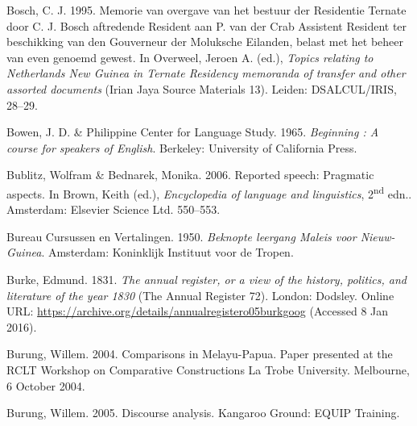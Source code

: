 \begin{styleCitaviBibliographyEntry}
Bosch, C. J. 1995. Memorie van overgave van het bestuur der Residentie Ternate door C. J. Bosch aftredende Resident aan P. van der Crab Assistent Resident ter beschikking van den Gouverneur der Moluksche Eilanden, belast met het beheer van even genoemd gewest. In Overweel, Jeroen A. (ed.), \textit{Topics relating to Netherlands New Guinea in Ternate Residency memoranda of transfer and other assorted documents} (Irian Jaya Source Materials 13). Leiden: DSALCUL/IRIS, 28–29.
\end{styleCitaviBibliographyEntry}

\begin{styleCitaviBibliographyEntry}
Bowen, J. D. \& Philippine Center for Language Study. 1965. \textit{Beginning : A course for speakers of English}. Berkeley: University of California Press.
\end{styleCitaviBibliographyEntry}

\begin{styleCitaviBibliographyEntry}
Bublitz, Wolfram \& Bednarek, Monika. 2006. Reported speech: Pragmatic aspects. In Brown, Keith (ed.), \textit{Encyclopedia of language and linguistics}, 2\textsuperscript{nd} edn.. Amsterdam: Elsevier Science Ltd. 550–553.
\end{styleCitaviBibliographyEntry}

\begin{styleCitaviBibliographyEntry}
Bureau Cursussen en Vertalingen. 1950. \textit{Beknopte leergang Maleis voor Nieuw-Guinea}. Amsterdam: Koninklijk Instituut voor de Tropen.
\end{styleCitaviBibliographyEntry}

\begin{styleCitaviBibliographyEntry}
Burke, Edmund. 1831. \textit{The annual register, or a view of the history, politics, and literature of the year 1830} (The Annual Register 72). London: Dodsley. Online URL: \url{https://archive.org/details/annualregistero05burkgoog} (Accessed 8 Jan 2016).
\end{styleCitaviBibliographyEntry}

\begin{styleCitaviBibliographyEntry}
Burung, Willem. 2004. Comparisons in Melayu-Papua. Paper presented at the RCLT Workshop on Comparative Constructions La Trobe University. Melbourne, 6 October 2004.
\end{styleCitaviBibliographyEntry}

\begin{styleCitaviBibliographyEntry}
Burung, Willem. 2005. Discourse analysis. Kangaroo Ground: EQUIP Training.
\end{styleCitaviBibliographyEntry}

